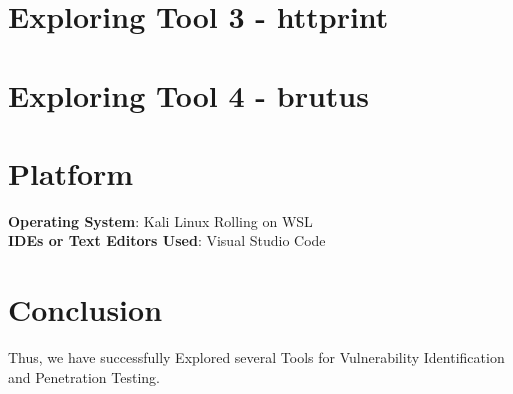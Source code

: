 \documentclass[11pt]{article}
\begin{document}
\section{Exploring Tool 3 - httprint}
\section{Exploring Tool 4 - brutus}

\section{Platform}
\textbf{Operating System}: Kali Linux Rolling on WSL\\
\textbf{IDEs or Text Editors Used}: Visual Studio Code\\

% 

\section{Conclusion}
Thus, we have successfully Explored several Tools for Vulnerability Identification and Penetration Testing.

\clearpage

\pagebreak
\end{document}
